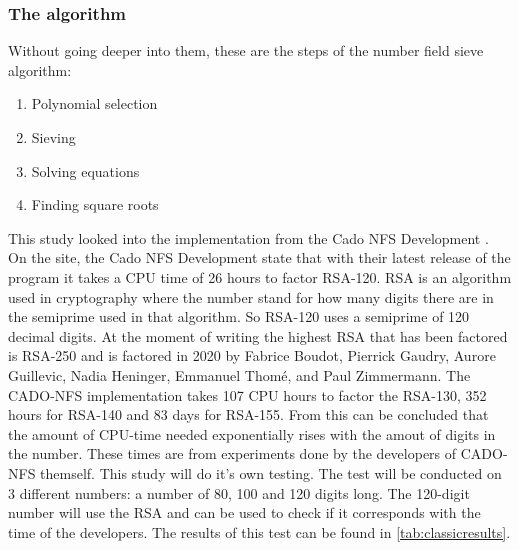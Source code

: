 \subsubsection{The algorithm}
Without going deeper into them, these are the steps of the number field sieve algorithm:
\begin{enumerate}
    \item Polynomial selection
    \item Sieving
    \item Solving equations
    \item Finding square roots
\end{enumerate}
This study looked into the implementation from the Cado NFS Development \textcite{cadoNFS}.
On the site, the Cado NFS Development \textcite{cadoNFS} state that with their latest release of the program it takes a CPU time of 26 hours to factor RSA-120. RSA is an algorithm used in cryptography where the number stand for how many digits there are in the semiprime used in that algorithm.
So RSA-120 uses a semiprime of 120 decimal digits. At the moment of writing the highest RSA that has been factored is RSA-250 and is factored in 2020 by Fabrice Boudot, Pierrick Gaudry, Aurore Guillevic, Nadia Heninger, Emmanuel Thomé, and Paul Zimmermann.
The CADO-NFS implementation takes 107 CPU hours to factor the RSA-130, 352 hours for RSA-140 and 83 days for RSA-155. From this can be concluded that the amount of CPU-time needed exponentially rises with the amout of digits in the number.
These times are from experiments done by the developers of CADO-NFS themself. This study will do it's own testing.
The test will be conducted on 3 different numbers: a number of 80, 100 and 120 digits long. The 120-digit number will use the RSA and can be used to check if it corresponds with the time of the developers.
The results of this test can be found in \ref{tab:classicresults}.


